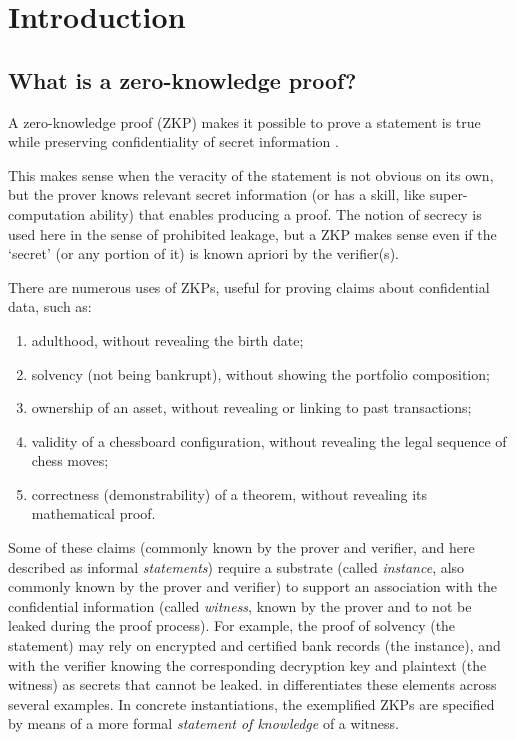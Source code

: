 \section{Introduction}
\label{security:intro}


\subsection{What is a zero-knowledge proof?}
\label{security:intro:what-is-a-ZK}


	A zero-knowledge proof (ZKP) makes it possible to prove a statement is true while preserving confidentiality of secret information \cite{1989:SJC:the-knowledge-complexity-of-interactive-proof-systems}.
	
	This makes sense when the veracity of the statement is not obvious on its own, but the prover knows relevant secret information (or has a skill, like super-computation ability) that enables producing a proof.
	The notion of secrecy is used here in the sense of prohibited leakage, but a ZKP makes sense even if the `secret' (or any portion of it) is known apriori by the verifier(s).


	
	There are numerous uses of ZKPs, useful for proving claims about confidential data, such as:
\begin{enumerate}
\item adulthood, without revealing the birth date;
\item solvency (not being bankrupt), without showing the portfolio composition;
\item ownership of an asset, without revealing or linking to past transactions;
\item validity of a chessboard configuration, without revealing the legal sequence of chess moves;
\item correctness (demonstrability) of a theorem, without revealing its mathematical proof.
\end{enumerate}


	
	Some of these claims (commonly known by the prover and verifier, and here described as informal \emph{statements}) require a substrate (called \emph{instance}, also commonly known by the prover and verifier) to support an association with the confidential information (called \emph{witness}, known by the prover and to not be leaked during the proof process).
	For example, the proof of solvency (the statement) may rely on encrypted and certified bank records (the instance), and with the verifier knowing the corresponding decryption key and plaintext (the witness) as secrets that cannot be leaked.
	 in  differentiates these elements across several examples.
	In concrete instantiations, the exemplified ZKPs are specified by means of a more formal \emph{statement of knowledge} of a witness.
	
